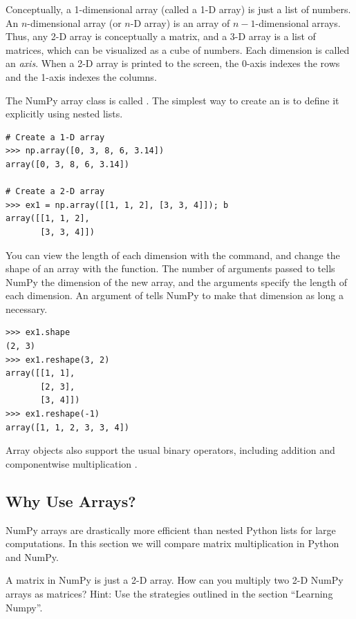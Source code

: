 Conceptually, a 1-dimensional array (called a 1-D array) is just a list of numbers. An $n$-dimensional array (or $n$-D array) is an array of $n-1$-dimensional arrays. Thus, any 2-D array is conceptually a matrix, and a 3-D array is a list of matrices, which can be visualized as a cube of numbers. Each dimension is called an \emph{axis}. When a 2-D array is printed to the screen, the 0-axis indexes the rows and the 1-axis indexes the columns.

The NumPy array class is called . The simplest way to create an  is
to define it explicitly using nested lists.
\begin{lstlisting}
# Create a 1-D array
>>> np.array([0, 3, 8, 6, 3.14])
array([0, 3, 8, 6, 3.14]) 

# Create a 2-D array
>>> ex1 = np.array([[1, 1, 2], [3, 3, 4]]); b
array([[1, 1, 2],
       [3, 3, 4]])
\end{lstlisting} 

You can view the length of each dimension with the  command, and change the shape of an array with the  function. The number of arguments passed to  tells NumPy the dimension of the new array, and the arguments specify the length of each dimension. An argument of  tells NumPy to make that dimension as long a necessary.
\begin{lstlisting}
>>> ex1.shape
(2, 3)
>>> ex1.reshape(3, 2)
array([[1, 1],
       [2, 3],
       [3, 4]])
>>> ex1.reshape(-1)
array([1, 1, 2, 3, 3, 4])
\end{lstlisting}

Array objects also support the usual binary operators, including addition \li{+} and componentwise multiplication \li{*}.

\subsection*{Why Use Arrays?}
NumPy arrays are drastically more efficient than nested Python lists for large computations. In this section we will compare matrix multiplication in Python and NumPy.

\begin{problem}\label{multiply_problem}
A matrix in NumPy is just a 2-D array. How can you multiply two 2-D NumPy arrays as matrices? Hint: Use the strategies outlined in the section ``Learning Numpy''.
\end{problem}

